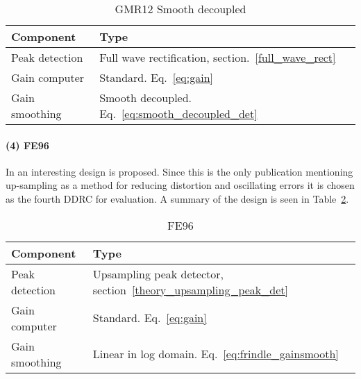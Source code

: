 \documentclass[../main2.tex]{subfiles}
\begin{document}
\begin{table}[h]
\begin{center}
\caption{GMR12 Smooth decoupled}
\label{tab:gmr12_decoupled}
\begin{tabular}{| l | l |}
	\hline
	Component & Type \\ \hline
	Peak detection & Full wave rectification, section.~\ref{full_wave_rect} \\
	Gain computer & Standard. Eq.~\eqref{eq:gain} \\
	Gain smoothing & Smooth decoupled. Eq.~\eqref{eq:smooth_decoupled_det} \\
	\hline
\end{tabular}
\end{center}
\end{table}

\paragraph{(4) FE96}
In \cite{frindle1996implementation} an interesting design is proposed. Since this is the only publication mentioning up-sampling as a method for reducing distortion and oscillating errors it is chosen as the fourth DDRC for evaluation. A summary of the design is seen in Table~\ref{tab:fe96}.
\begin{table}[h]
\begin{center}
\caption{FE96}
\label{tab:fe96}
\begin{tabular}{| l | l |}
	\hline
	Component & Type \\ \hline
	Peak detection & Upsampling peak detector, section~\ref{theory_upsampling_peak_det} \\
	Gain computer & Standard. Eq.~\eqref{eq:gain} \\
	Gain smoothing & Linear in log domain. Eq.~\eqref{eq:frindle_gainsmooth} \\
	\hline
\end{tabular}
\end{center}
\end{table}
\end{document}
